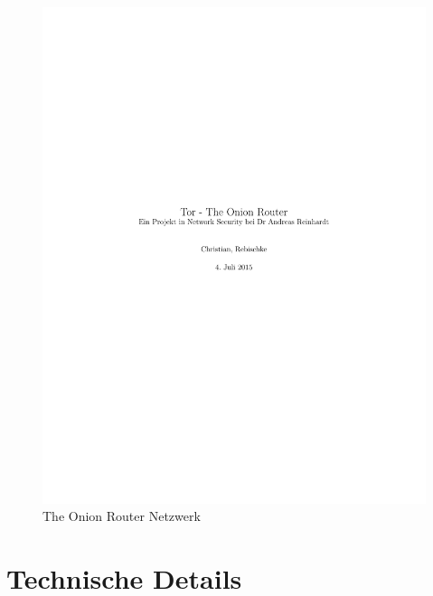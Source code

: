 \documentclass[titlepage]{article}
\begin{document}
\begin{figure}[h]
\includegraphics[scale=1.0]{tor}
\centering
 \caption{The Onion Router Netzwerk}
 \label{tor}
\end{figure}

\newpage
\section{Technische Details}
\end{document}
